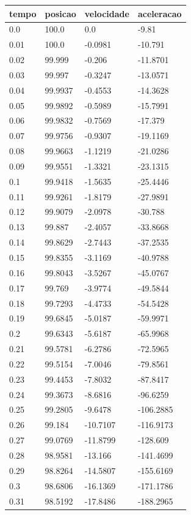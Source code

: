 \begin{tabular}{llll}
\toprule
tempo & posicao & velocidade & aceleracao \\
\midrule
0.0 & 100.0 & 0.0 & -9.81 \\
0.01 & 100.0 & -0.0981 & -10.791 \\
0.02 & 99.999 & -0.206 & -11.8701 \\
0.03 & 99.997 & -0.3247 & -13.0571 \\
0.04 & 99.9937 & -0.4553 & -14.3628 \\
0.05 & 99.9892 & -0.5989 & -15.7991 \\
0.06 & 99.9832 & -0.7569 & -17.379 \\
0.07 & 99.9756 & -0.9307 & -19.1169 \\
0.08 & 99.9663 & -1.1219 & -21.0286 \\
0.09 & 99.9551 & -1.3321 & -23.1315 \\
0.1 & 99.9418 & -1.5635 & -25.4446 \\
0.11 & 99.9261 & -1.8179 & -27.9891 \\
0.12 & 99.9079 & -2.0978 & -30.788 \\
0.13 & 99.887 & -2.4057 & -33.8668 \\
0.14 & 99.8629 & -2.7443 & -37.2535 \\
0.15 & 99.8355 & -3.1169 & -40.9788 \\
0.16 & 99.8043 & -3.5267 & -45.0767 \\
0.17 & 99.769 & -3.9774 & -49.5844 \\
0.18 & 99.7293 & -4.4733 & -54.5428 \\
0.19 & 99.6845 & -5.0187 & -59.9971 \\
0.2 & 99.6343 & -5.6187 & -65.9968 \\
0.21 & 99.5781 & -6.2786 & -72.5965 \\
0.22 & 99.5154 & -7.0046 & -79.8561 \\
0.23 & 99.4453 & -7.8032 & -87.8417 \\
0.24 & 99.3673 & -8.6816 & -96.6259 \\
0.25 & 99.2805 & -9.6478 & -106.2885 \\
0.26 & 99.184 & -10.7107 & -116.9173 \\
0.27 & 99.0769 & -11.8799 & -128.609 \\
0.28 & 98.9581 & -13.166 & -141.4699 \\
0.29 & 98.8264 & -14.5807 & -155.6169 \\
0.3 & 98.6806 & -16.1369 & -171.1786 \\
0.31 & 98.5192 & -17.8486 & -188.2965 \\

\end{tabular}
